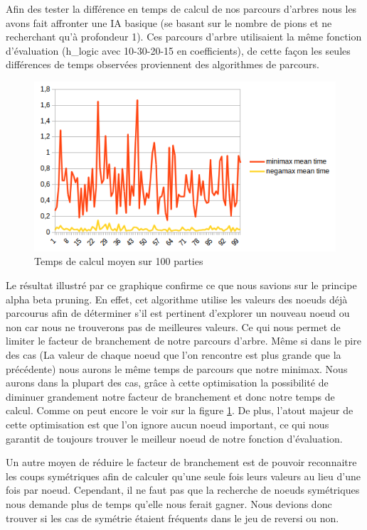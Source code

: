 \documentclass[12pt]{article}
\begin{document}
Afin des tester la différence en temps de calcul de nos parcours d'arbres nous les avons fait affronter une IA basique (se basant sur le nombre de pions et ne recherchant qu'à profondeur 1). Ces  parcours d'arbre utilisaient la même fonction d'évaluation (h\_logic avec 10-30-20-15 en coefficients), de cette façon les seules différences de temps observées proviennent des algorithmes de parcours.

\begin{figure}[H]
\includegraphics[scale=0.6]{temps_calcul_moyen.png}
\centering
\caption{Temps de calcul moyen sur 100 parties}
\label{graphique-temp}
\end{figure}

Le résultat illustré par ce graphique confirme ce que nous savions sur le principe alpha beta pruning. En effet, cet algorithme utilise les valeurs des noeuds déjà parcourus afin de déterminer s'il est pertinent d'explorer un nouveau noeud ou non car nous ne trouverons pas de meilleures valeurs. Ce qui nous permet de limiter le facteur de branchement de notre parcours d'arbre. Même si dans le pire des cas (La valeur de chaque noeud que l'on rencontre est plus grande que la précédente) nous aurons le même temps de parcours que notre minimax. Nous aurons dans la plupart des cas, grâce à cette optimisation la possibilité de diminuer grandement notre facteur de branchement et donc notre temps de calcul. Comme on peut encore le voir sur la figure \ref{graphique-temp}. De plus, l'atout majeur de cette optimisation est que l'on ignore aucun noeud important, ce qui nous garantit de toujours trouver le meilleur noeud de notre fonction d'évaluation.

\medbreak

Un autre moyen de réduire le facteur de branchement est de pouvoir reconnaitre les coups symétriques afin de calculer qu'une seule fois leurs valeurs au lieu d'une fois par noeud. Cependant, il ne faut pas que la recherche de noeuds symétriques nous demande plus de temps qu'elle nous ferait gagner. Nous devions donc trouver si les cas de symétrie étaient fréquents dans le jeu de reversi ou non.
\end{document}
